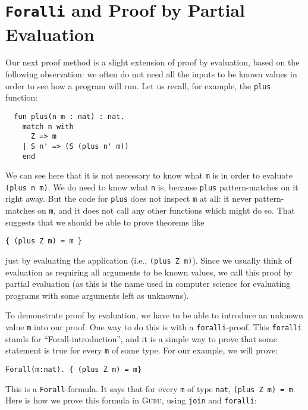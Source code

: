 \documentclass{book}[12pt]
\newcommand{\guru}[0]{\textsc{Guru}\xspace}
\begin{document}
\section{\texttt{Foralli} and Proof by Partial Evaluation}
\label{ch3:peval}

Our next proof method is a slight extension of proof by evaluation,
based on the following observation: we often do not need all the
inputs to be known values in order to see how a program will run.  Let
us recall, for example, the \texttt{plus} function:

\begin{verbatim}
  fun plus(n m : nat) : nat.
    match n with
      Z => m
    | S n' => (S (plus n' m))
    end
\end{verbatim}

\noindent We can see here that it is not necessary to know what
\texttt{m} is in order to evaluate \texttt{(plus n m)}.  We do need to
know what \texttt{n} is, because \texttt{plus} pattern-matches on it
right away.  But the code for \texttt{plus} does not inspect
\texttt{m} at all: it never pattern-matches on \texttt{m}, and it does
not call any other functions which might do so.  That suggests that
we should be able to prove theorems like

\begin{verbatim}
{ (plus Z m) = m }
\end{verbatim}

\noindent just by evaluating the application (i.e., \texttt{(plus Z m)}).  
Since we usually think of evaluation as requiring all arguments to be
known values, we call this proof by partial evaluation (as this is the
name used in computer science for evaluating programs with some arguments
left as unknowns).

To demonstrate proof by evaluation, we have to be able to introduce an
unknown value \texttt{m} into our proof.  One way to do this is with a
\texttt{foralli}-proof.  This \texttt{foralli} stands for
``Forall-introduction'', and it is a simple way to prove that some
statement is true for every \texttt{m} of some type.  For our example,
we will prove:

\begin{verbatim}
Forall(m:nat). { (plus Z m) = m}
\end{verbatim}

\noindent This is a \texttt{Forall}-formula.  It says that for every
\texttt{m} of type \texttt{nat}, \texttt{(plus Z m) = m}.  Here is how
we prove this formula in \guru, using \texttt{join} and \texttt{foralli}:
\end{document}
